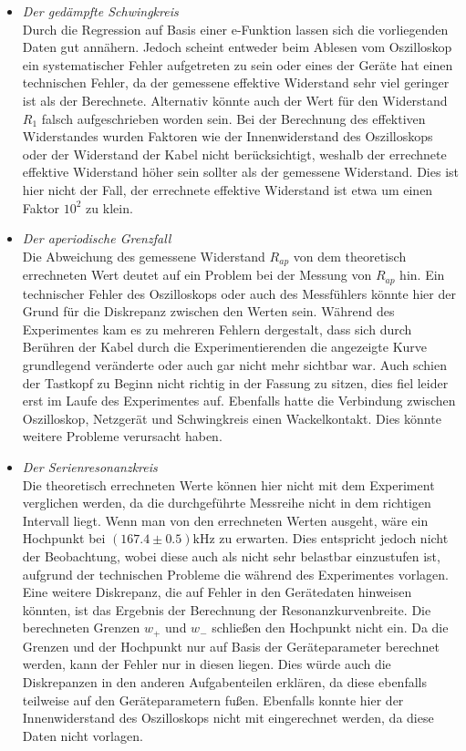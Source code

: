 \begin{itemize}
  \item \textit{Der gedämpfte Schwingkreis} \\
  Durch die Regression auf Basis einer e-Funktion lassen sich die vorliegenden Daten gut
  annähern. Jedoch scheint entweder beim Ablesen vom Oszilloskop ein systematischer
  Fehler aufgetreten zu sein oder eines der Geräte hat einen technischen Fehler, da der
  gemessene effektive Widerstand sehr viel geringer ist als der Berechnete.
  Alternativ könnte  auch der Wert für den Widerstand $R_1$ falsch aufgeschrieben worden
  sein. Bei der Berechnung des effektiven Widerstandes wurden Faktoren wie der
  Innenwiderstand des Oszilloskops oder der Widerstand der Kabel nicht berücksichtigt,
  weshalb der errechnete effektive Widerstand höher sein sollter als der gemessene
  Widerstand. Dies ist hier nicht der Fall, der errechnete effektive Widerstand ist etwa
  um einen Faktor $10^2$ zu klein.

  \item \textit{Der aperiodische Grenzfall} \\
  Die Abweichung des gemessene Widerstand $R_{ap}$ von dem theoretisch errechneten Wert
  deutet auf ein Problem bei der Messung von $R_{ap}$ hin. Ein technischer Fehler des
  Oszilloskops oder auch des Messfühlers könnte hier der Grund für die Diskrepanz
  zwischen den Werten sein. Während des Experimentes kam es zu mehreren Fehlern
  dergestalt, dass sich durch Berühren der Kabel durch die Experimentierenden die
  angezeigte Kurve grundlegend veränderte oder auch gar nicht mehr sichtbar war. Auch
  schien der Tastkopf zu Beginn nicht richtig in der Fassung zu sitzen, dies fiel leider
  erst im Laufe des Experimentes auf. Ebenfalls hatte die Verbindung zwischen
  Oszilloskop, Netzgerät und Schwingkreis einen Wackelkontakt. Dies könnte weitere
  Probleme verursacht haben.

  \item \textit{Der Serienresonanzkreis} \\
  Die theoretisch errechneten Werte können hier nicht mit dem Experiment verglichen werden, da die durchgeführte Messreihe nicht in dem richtigen
  Intervall liegt. Wenn man von den errechneten Werten ausgeht, wäre ein Hochpunkt bei $(167.4 \pm 0.5) \si{\kilo\hertz}$ zu erwarten. Dies entspricht
  jedoch nicht der Beobachtung, wobei diese auch als nicht sehr belastbar einzustufen ist, aufgrund der technischen Probleme die während des
  Experimentes vorlagen. Eine weitere Diskrepanz, die auf Fehler in den Gerätedaten hinweisen könnten, ist das Ergebnis der Berechnung der
  Resonanzkurvenbreite. Die berechneten Grenzen $w_+$ und $w_-$ schließen den Hochpunkt nicht ein. Da die Grenzen und der Hochpunkt nur auf Basis der
  Geräteparameter berechnet werden, kann der Fehler nur in diesen liegen. Dies würde auch die Diskrepanzen in den anderen Aufgabenteilen erklären, da
  diese ebenfalls teilweise auf den Geräteparametern fußen. Ebenfalls konnte hier der Innenwiderstand des Oszilloskops nicht mit eingerechnet werden,
  da diese Daten nicht vorlagen.
\end{itemize}
